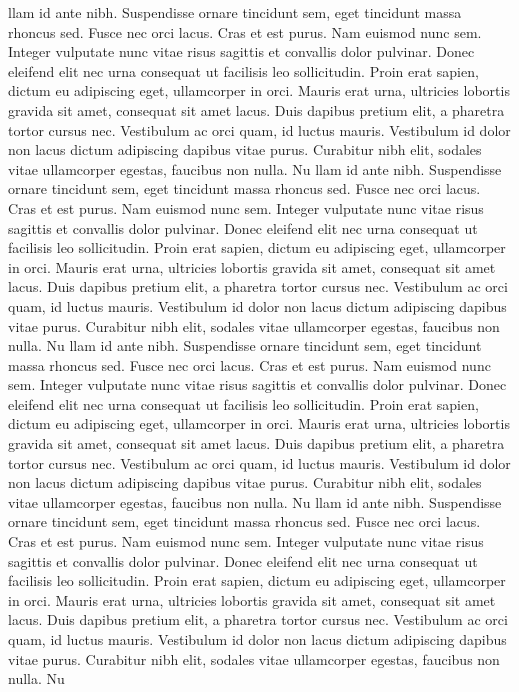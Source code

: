 \documentclass{article}
\begin{document}
\begin{multicols*}{2}
llam id ante nibh. Suspendisse ornare tincidunt sem, eget tincidunt massa rhoncus sed. Fusce nec orci lacus. Cras et est purus.
Nam euismod nunc sem. Integer vulputate nunc vitae risus sagittis et convallis dolor pulvinar. Donec eleifend elit nec urna consequat ut facilisis leo sollicitudin. Proin erat sapien, dictum eu adipiscing eget, ullamcorper in orci. Mauris erat urna, ultricies lobortis gravida sit amet, consequat sit amet lacus. Duis dapibus pretium elit, a pharetra tortor cursus nec. Vestibulum ac orci quam, id luctus mauris. Vestibulum id dolor non lacus dictum adipiscing dapibus vitae purus. Curabitur nibh elit, sodales vitae ullamcorper egestas, faucibus non nulla. Nu
llam id ante nibh. Suspendisse ornare tincidunt sem, eget tincidunt massa rhoncus sed. Fusce nec orci lacus. Cras et est purus.
Nam euismod nunc sem. Integer vulputate nunc vitae risus sagittis et convallis dolor pulvinar. Donec eleifend elit nec urna consequat ut facilisis leo sollicitudin. Proin erat sapien, dictum eu adipiscing eget, ullamcorper in orci. Mauris erat urna, ultricies lobortis gravida sit amet, consequat sit amet lacus. Duis dapibus pretium elit, a pharetra tortor cursus nec. Vestibulum ac orci quam, id luctus mauris. Vestibulum id dolor non lacus dictum adipiscing dapibus vitae purus. Curabitur nibh elit, sodales vitae ullamcorper egestas, faucibus non nulla. Nu
llam id ante nibh. Suspendisse ornare tincidunt sem, eget tincidunt massa rhoncus sed. Fusce nec orci lacus. Cras et est purus.
Nam euismod nunc sem. Integer vulputate nunc vitae risus sagittis et convallis dolor pulvinar. Donec eleifend elit nec urna consequat ut facilisis leo sollicitudin. Proin erat sapien, dictum eu adipiscing eget, ullamcorper in orci. Mauris erat urna, ultricies lobortis gravida sit amet, consequat sit amet lacus. Duis dapibus pretium elit, a pharetra tortor cursus nec. Vestibulum ac orci quam, id luctus mauris. Vestibulum id dolor non lacus dictum adipiscing dapibus vitae purus. Curabitur nibh elit, sodales vitae ullamcorper egestas, faucibus non nulla. Nu
llam id ante nibh. Suspendisse ornare tincidunt sem, eget tincidunt massa rhoncus sed. Fusce nec orci lacus. Cras et est purus.
Nam euismod nunc sem. Integer vulputate nunc vitae risus sagittis et convallis dolor pulvinar. Donec eleifend elit nec urna consequat ut facilisis leo sollicitudin. Proin erat sapien, dictum eu adipiscing eget, ullamcorper in orci. Mauris erat urna, ultricies lobortis gravida sit amet, consequat sit amet lacus. Duis dapibus pretium elit, a pharetra tortor cursus nec. Vestibulum ac orci quam, id luctus mauris. Vestibulum id dolor non lacus dictum adipiscing dapibus vitae purus. Curabitur nibh elit, sodales vitae ullamcorper egestas, faucibus non nulla. Nu

\end{multicols*}
\end{document}

